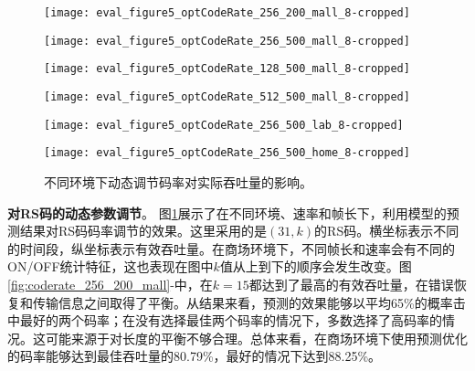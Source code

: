 \begin{figure}[t]
	\begin{minipage}[b]{.32\linewidth}
		\texttt{[image: eval\_figure5\_optCodeRate\_256\_200\_mall\_8-cropped]}
		\label{fig:coderate_256_200_mall}
	\end{minipage}
	\hfill
	\begin{minipage}[b]{.32\linewidth}
		\texttt{[image: eval\_figure5\_optCodeRate\_256\_500\_mall\_8-cropped]}
		\label{fig:coderate_256_500_mall}
	\end{minipage}
	\hfill
	\begin{minipage}[b]{.32\linewidth}
		\texttt{[image: eval\_figure5\_optCodeRate\_128\_500\_mall\_8-cropped]}
		\label{fig:coderate_128_500_mall}
	\end{minipage}

	\begin{minipage}[b]{.32\linewidth}
		\texttt{[image: eval\_figure5\_optCodeRate\_512\_500\_mall\_8-cropped]}
		\label{fig:coderate_512_500_mall}
	\end{minipage}
	\hfill
	\begin{minipage}[b]{.32\linewidth}
		\texttt{[image: eval\_figure5\_optCodeRate\_256\_500\_lab\_8-cropped]}
		\label{fig:coderate_256_200_lab}
	\end{minipage}
	\hfill
	\begin{minipage}[b]{.32\linewidth}
		\texttt{[image: eval\_figure5\_optCodeRate\_256\_500\_home\_8-cropped]}
		\label{fig:coderate_256_200_home}
	\end{minipage}
	\caption{不同环境下动态调节码率对实际吞吐量的影响。}\label{fig:coderate}
\end{figure}
\textbf{对RS码的动态参数调节}。
图\ref{fig:coderate}展示了在不同环境、速率和帧长下，利用模型的预测结果对RS码码率调节的效果。这里采用的是$(31, k)$的RS码。横坐标表示不同的时间段，纵坐标表示有效吞吐量。在商场环境下，不同帧长和速率会有不同的ON/OFF统计特征，这也表现在图中$k$值从上到下的顺序会发生改变。图\ref{fig:coderate_256_200_mall}-中，在$k = 15$都达到了最高的有效吞吐量，在错误恢复和传输信息之间取得了平衡。从结果来看，预测的效果能够以平均65\%的概率击中最好的两个码率；在没有选择最佳两个码率的情况下，多数选择了高码率的情况。这可能来源于对长度的平衡不够合理。总体来看，在商场环境下使用预测优化的码率能够达到最佳吞吐量的80.79\%，最好的情况下达到88.25\%。

